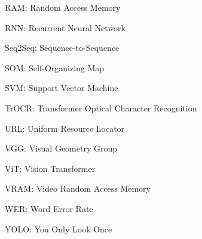 \begin{adjustwidth}{0.2cm}{0.2cm}
    {\large RAM: Random Access Memory\dotfill\par}
    {\large RNN: Recurrent Neural Network\dotfill\par}
    {\large Seq2Seq: Sequence-to-Sequence\dotfill\par}
    {\large SOM: Self-Organizing Map\dotfill\par}
    {\large SVM: Support Vector Machine\dotfill\par}
    {\large TrOCR: Transformer Optical Character Recognition\dotfill\par}
    {\large URL: Uniform Resource Locator\dotfill\par}
    {\large VGG: Visual Geometry Group\dotfill\par}
    {\large ViT: Vision Transformer\dotfill\par}
    {\large VRAM: Video Random Access Memory\dotfill\par}
    {\large WER: Word Error Rate\dotfill\par}
    {\large YOLO: You Only Look Once\dotfill\par}

\end{adjustwidth}